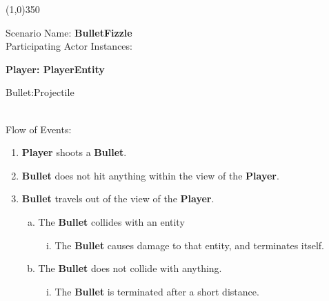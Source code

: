 \documentclass[12pt]{article}       %
\begin{document}
\begin{center} \line(1,0){350} \end{center}
Scenario Name: {\bf BulletFizzle} \\
Participating Actor Instances:        \hspace{46pt} {\bf Player: PlayerEntity

					          \hspace{2.6 in}   Bullet:Projectile}  \vspace{10pt}  \\ 
Flow of Events: 
\begin{enumerate} 
\item {\bf Player} shoots a {\bf Bullet}.
\item {\bf Bullet} does not hit anything within the view of the {\bf Player}.
\item {\bf Bullet} travels out of the view of the {\bf Player}.
      \begin{enumerate}[a.]
       \item The {\bf Bullet} collides with an entity
                \begin{enumerate}[i.]
                \item The {\bf Bullet} causes damage to that entity, and terminates itself.
                \end{enumerate}
      \item The {\bf Bullet} does not collide with anything.
                \begin{enumerate}[i.]
                \item The {\bf Bullet} is terminated after a short distance.
                \end{enumerate}
        \end{enumerate}
\end{enumerate}
\end{document}

